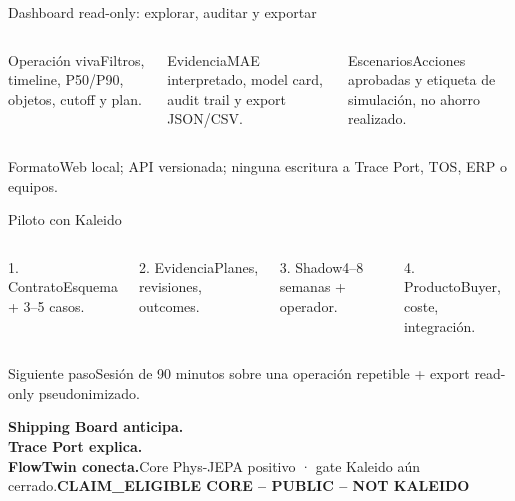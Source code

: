 \documentclass[aspectratio=169,10pt]{beamer}
\newcommand{\claim}{\colorbox{Gold!22}{\textcolor{Ink}{\scriptsize\bfseries CLAIM\_ELIGIBLE CORE -- PUBLIC -- NOT KALEIDO}}}
\begin{document}
\begin{frame}{Dashboard read-only: explorar, auditar y exportar}\begin{columns}[T]\begin{block}{Operación viva}Filtros, timeline, P50/P90, objetos, cutoff y plan.\end{block}\begin{block}{Evidencia}MAE interpretado, model card, audit trail y export JSON/CSV.\end{block}\begin{block}{Escenarios}Acciones aprobadas y etiqueta de simulación, no ahorro realizado.\end{block}\end{columns}\vfill\begin{alertblock}{Formato}Web local; API versionada; ninguna escritura a Trace Port, TOS, ERP o equipos.\end{alertblock}\end{frame}
\begin{frame}{Piloto con Kaleido}\begin{columns}[T]\begin{block}{1. Contrato}Esquema + 3--5 casos.\end{block}\begin{block}{2. Evidencia}Planes, revisiones, outcomes.\end{block}\begin{block}{3. Shadow}4--8 semanas + operador.\end{block}\begin{block}{4. Producto}Buyer, coste, integración.\end{block}\end{columns}\vfill\begin{alertblock}{Siguiente paso}Sesión de 90 minutos sobre una operación repetible + export read-only pseudonimizado.\end{alertblock}\end{frame}
\begin{frame}[plain]\color{white}\vspace{5mm}\par{\fontsize{27}{30}\selectfont\bfseries Shipping Board anticipa.\\Trace Port explica.\\FlowTwin conecta.}\vfill Core Phys-JEPA positivo · gate Kaleido aún cerrado.\hfill\claim\end{frame}
\end{document}
